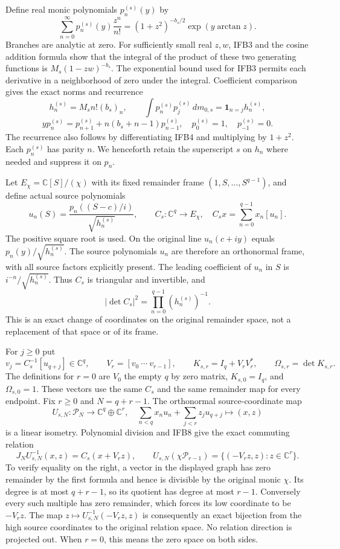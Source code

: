 Define real monic polynomials $p_n^{(s)}(y)$ by
\[
 \sum_{n=0}^\infty p_n^{(s)}(y)\frac{z^n}{n!}
 =(1+z^2)^{-b_s/2}\exp(y\arctan z).
 \tag{IFB4}
\]
Branches are analytic at zero. For sufficiently small real $z,w$,
IFB3 and the cosine addition formula show that the integral of the
product of these two generating functions is
$M_s(1-zw)^{-b_s}$. The exponential bound used for IFB3 permits
each derivative in a neighborhood of zero under the integral.
Coefficient comparison gives the exact norms and recurrence
\[
 h_n^{(s)}=M_s n!(b_s)_n,\qquad
 \int p_n^{(s)}p_j^{(s)}\,dm_{0,s}
       =\mathbf1_{n=j}h_n^{(s)},
\]
\[
 yp_n^{(s)}=p_{n+1}^{(s)}+n(b_s+n-1)p_{n-1}^{(s)},\quad
 p_0^{(s)}=1,\quad p_{-1}^{(s)}=0.
 \tag{IFB5}
\]
The recurrence also follows by differentiating IFB4 and multiplying
by $1+z^2$. Each $p_n^{(s)}$ has parity $n$. We henceforth retain
the superscript $s$ on $h_n$ where needed and suppress it on $p_n$.

Let $E_\chi=\mathbb C[S]/(\chi)$ with its fixed remainder frame
$(1,S,\ldots,S^{q-1})$, and define actual source polynomials
\[
 u_n(S)=\frac{p_n((S-c)/i)}{\sqrt{h_n^{(s)}}},\qquad
 C_s:\mathbb C^q\longrightarrow E_\chi,\quad
 C_s x=\sum_{n=0}^{q-1}x_n[u_n].
 \tag{IFB6}
\]
The positive square root is used. On the original line $u_n(c+iy)$
equals $p_n(y)/\sqrt{h_n^{(s)}}$. The source polynomials $u_n$ are
therefore an orthonormal frame, with all source factors explicitly
present. The leading coefficient of $u_n$ in $S$ is
$i^{-n}/\sqrt{h_n^{(s)}}$. Thus $C_s$ is triangular and invertible,
and
\[
 |\det C_s|^2=\prod_{n=0}^{q-1}(h_n^{(s)})^{-1}.
 \tag{IFB7}
\]
This is an exact change of coordinates on the original remainder
space, not a replacement of that space or of its frame.

For $j\geq0$ put
\[
 v_j=C_s^{-1}[u_{q+j}]\in\mathbb C^q,\qquad
 V_r=[v_0\ \cdots\ v_{r-1}],\qquad
 K_{s,r}=I_q+V_rV_r^*,\qquad \Omega_{s,r}=\det K_{s,r}.
 \tag{IFB8}
\]
The definitions for $r=0$ are $V_0$ the empty $q$ by zero matrix,
$K_{s,0}=I_q$, and $\Omega_{s,0}=1$. These vectors use the same
$C_s$ and the same remainder map for every endpoint. Fix
$r\geq0$ and $N=q+r-1$. The orthonormal source-coordinate map
\[
 U_{s,N}:\mathcal P_N\longrightarrow\mathbb C^q\oplus\mathbb C^r,
 \quad
 \sum_{n<q}x_nu_n+\sum_{j<r}z_ju_{q+j}\longmapsto(x,z)
\]
is a linear isometry. Polynomial division and IFB8 give the exact
commuting relation
\[
 J_NU_{s,N}^{-1}(x,z)=C_s(x+V_rz),\qquad
 U_{s,N}(\chi\mathcal P_{r-1})
       =\{(-V_rz,z):z\in\mathbb C^r\}.
 \tag{IFB9}
\]
To verify equality on the right, a vector in the displayed graph
has zero remainder by the first formula and hence is divisible by
the original monic $\chi$. Its degree is at most $q+r-1$, so its
quotient has degree at most $r-1$. Conversely every such multiple
has zero remainder, which forces its low coordinate to be $-V_rz$.
The map $z\mapsto U_{s,N}^{-1}(-V_rz,z)$ is consequently an exact
bijection from the high source coordinates to the original relation
space. No relation direction is projected out. When $r=0$, this
means the zero space on both sides.

